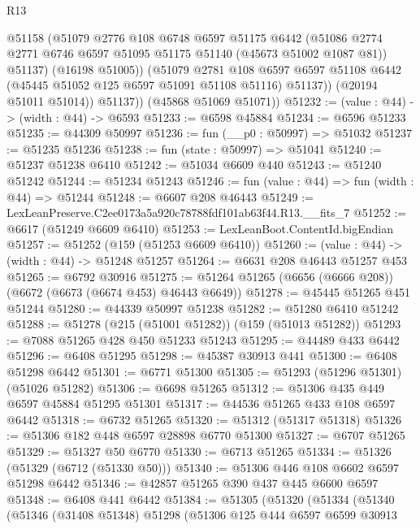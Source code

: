 \begin{lexlean}{R13}
\begin{coremodule}
                @51158
                (@51079
                  @2776
                  @108
                  @6748
                  @6597
                  @51175
                  @6442
                  (@51086 @2774 @2771 @6746 @6597 @51095 @51175 @51140 (@45673 @51002 @1087 @81))
                  @51137)
                (@16198 @51005))
              (@51079
                @2781
                @108
                @6597
                @6597
                @51108
                @6442
                (@45445 @51052 @125 @6597 @51091 @51108 @51116)
                @51137))
            (@20194 @51011 @51014))
          @51137))
      (@45868 @51069 @51071))
@51232 := (value : @44) -> (width : @44) -> @6593
@51233 := @6598 @45884
@51234 := @6596 @51233
@51235 := @44309 @50997
@51236 := fun (__p0 : @50997) => @51032
@51237 := @51235 @51236
@51238 := fun (state : @50997) => @51041
@51240 := @51237 @51238 @6410
@51242 := @51034 @6609 @440
@51243 := @51240 @51242
@51244 := @51234 @51243
@51246 := fun (value : @44) => fun (width : @44) => @51244
@51248 := @6607 @208 @46443
@51249 := LexLeanPreserve.C2ee0173a5a920c78788fdf101ab63f44.R13.__fits_7
@51252 := @6617 (@51249 @6609 @6410)
@51253 := LexLeanBoot.ContentId.bigEndian
@51257 := @51252 (@159 (@51253 @6609 @6410))
@51260 := (value : @44) -> (width : @44) -> @51248 @51257
@51264 := @6631 @208 @46443 @51257 @453
@51265 := @6792 @30916
@51275 := @51264 @51265 (@6656 (@6666 @208)) (@6672 (@6673 (@6674 @453) @46443 @6649))
@51278 := @45445 @51265 @451 @51244
@51280 := @44339 @50997 @51238
@51282 := @51280 @6410 @51242
@51288 := @51278 (@215 (@51001 @51282)) (@159 (@51013 @51282))
@51293 := @7088 @51265 @428 @450 @51233 @51243
@51295 := @44489 @433 @6442
@51296 := @6408 @51295
@51298 := @45387 @30913 @441
@51300 := @6408 @51298 @6442
@51301 := @6771 @51300
@51305 := @51293 (@51296 @51301) (@51026 @51282)
@51306 := @6698 @51265
@51312 := @51306 @435 @449 @6597 @45884 @51295 @51301
@51317 := @44536 @51265 @433 @108 @6597 @6442
@51318 := @6732 @51265
@51320 := @51312 (@51317 @51318)
@51326 := @51306 @182 @448 @6597 @28898 @6770 @51300
@51327 := @6707 @51265
@51329 := @51327 @50 @6770
@51330 := @6713 @51265
@51334 := @51326 (@51329 (@6712 (@51330 @50)))
@51340 := @51306 @446 @108 @6602 @6597 @51298 @6442
@51346 := @42857 @51265 @390 @437 @445 @6600 @6597
@51348 := @6408 @441 @6442
@51384 := @51305
    (@51320
      (@51334
        (@51340
          (@51346
            (@31408 @51348)
            @51298
            (@51306
              @125
              @444
              @6597
              @6599
              @30913

\end{coremodule}
\end{lexlean}

